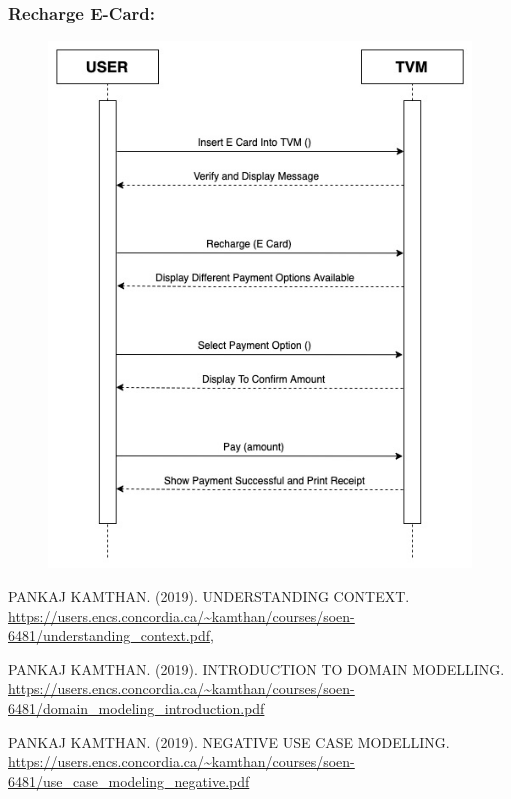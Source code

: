 \documentclass[11pt,oneside]{book}
\begin{document}
\subsubsection{Recharge E-Card:}
\begin{figure}[htp]
\includegraphics[width = 12cm]{images/image2.jpg} 
    \centering
\end{figure}

\begin{thebibliography}{1}

   PANKAJ KAMTHAN. (2019). UNDERSTANDING CONTEXT. {\url{ https://users.encs.concordia.ca/~kamthan/courses/soen-6481/understanding_context.pdf}},

  PANKAJ KAMTHAN. (2019). INTRODUCTION TO DOMAIN MODELLING.
 {\url{https://users.encs.concordia.ca/~kamthan/courses/soen-6481/domain_modeling_introduction.pdf}}

  PANKAJ KAMTHAN. (2019). NEGATIVE USE CASE MODELLING.
 {\url{https://users.encs.concordia.ca/~kamthan/courses/soen-6481/use_case_modeling_negative.pdf}}

  
  \end{thebibliography}
\end{document}
